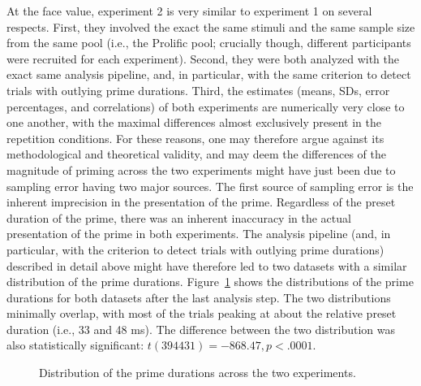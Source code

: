 \documentclass[
]{interact}
\begin{document}
At the face value, experiment 2 is very similar to experiment 1 on
several respects. First, they involved the exact the same stimuli and
the same sample size from the same pool (i.e., the Prolific pool;
crucially though, different participants were recruited for each
experiment). Second, they were both analyzed with the exact same
analysis pipeline, and, in particular, with the same criterion to detect
trials with outlying prime durations. Third, the estimates (means, SDs,
error percentages, and correlations) of both experiments are numerically
very close to one another, with the maximal differences almost
exclusively present in the repetition conditions. For these reasons, one
may therefore argue against its methodological and theoretical validity,
and may deem the differences of the magnitude of priming across the two
experiments might have just been due to sampling error having two major
sources. The first source of sampling error is the inherent imprecision
in the presentation of the prime. Regardless of the preset duration of
the prime, there was an inherent inaccuracy in the actual presentation
of the prime in both experiments. The analysis pipeline (and, in
particular, with the criterion to detect trials with outlying prime
durations) described in detail above might have therefore led to two
datasets with a similar distribution of the prime durations.
Figure~\ref{fig-prime-distributions} shows the distributions of the
prime durations for both datasets after the last analysis step. The two
distributions minimally overlap, with most of the trials peaking at
about the relative preset duration (i.e., 33 and 48 ms). The difference
between the two distribution was also statistically significant:
\(t(394431)=-868.47, p<.0001\).

\label{cell-fig-prime-distributions}
\begin{figure}[H]


\caption{\label{fig-prime-distributions}Distribution of the prime
durations across the two experiments.}

\end{figure}%
\end{document}
